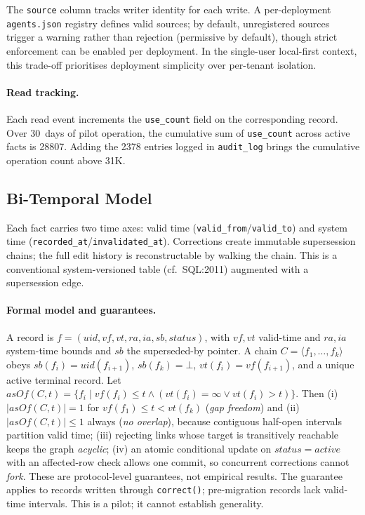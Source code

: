 \documentclass{llncs}
\begin{document}
The \texttt{source} column tracks writer identity for each write. A per-deployment \texttt{agents.json} registry defines valid sources; by default, unregistered sources trigger a warning rather than rejection (permissive by default), though strict enforcement can be enabled per deployment. In the single-user local-first context, this trade-off prioritises deployment simplicity over per-tenant isolation.

\paragraph{Read tracking.}
Each read event increments the \texttt{use\_count} field on the corresponding record. Over 30~days of pilot operation, the cumulative sum of \texttt{use\_count} across active facts is 28{}807. Adding the 2{}378 entries logged in \texttt{audit\_log} brings the cumulative operation count above 31K.

\subsection{Bi-Temporal Model}
Each fact carries two time axes: valid time (\texttt{valid\_from}/\texttt{valid\_to}) and system time (\texttt{recorded\_at}/\texttt{invalidated\_at}). Corrections create immutable supersession chains; the full edit history is reconstructable by walking the chain. This is a conventional system-versioned table (cf.\ SQL:2011) augmented with a supersession edge.

\paragraph{Formal model and guarantees.} A record is $f=(\mathit{uid},\mathit{vf},\mathit{vt},\mathit{ra},\mathit{ia},\mathit{sb},\mathit{status})$, with $\mathit{vf},\mathit{vt}$ valid-time and $\mathit{ra},\mathit{ia}$ system-time bounds and $\mathit{sb}$ the superseded-by pointer. A chain $C=\langle f_1,\ldots,f_k\rangle$ obeys $\mathit{sb}(f_i)=\mathit{uid}(f_{i+1})$, $\mathit{sb}(f_k)=\bot$, $\mathit{vt}(f_i)=\mathit{vf}(f_{i+1})$, and a unique active terminal record. Let $\mathit{asOf}(C,t)=\{f_i\mid \mathit{vf}(f_i)\le t\wedge(\mathit{vt}(f_i)=\infty\vee \mathit{vt}(f_i)>t)\}$. Then (i) $|\mathit{asOf}(C,t)|=1$ for $\mathit{vf}(f_1)\le t<\mathit{vt}(f_k)$ (\emph{gap freedom}) and (ii) $|\mathit{asOf}(C,t)|\le 1$ always (\emph{no overlap}), because contiguous half-open intervals partition valid time; (iii) rejecting links whose target is transitively reachable keeps the graph \emph{acyclic}; (iv) an atomic conditional update on $\mathit{status}{=}\mathit{active}$ with an affected-row check allows one commit, so concurrent corrections cannot \emph{fork}. These are protocol-level guarantees, not empirical results. The guarantee applies to records written through \texttt{correct()}; pre-migration records lack valid-time intervals. This is a pilot; it cannot establish generality.
\end{document}
